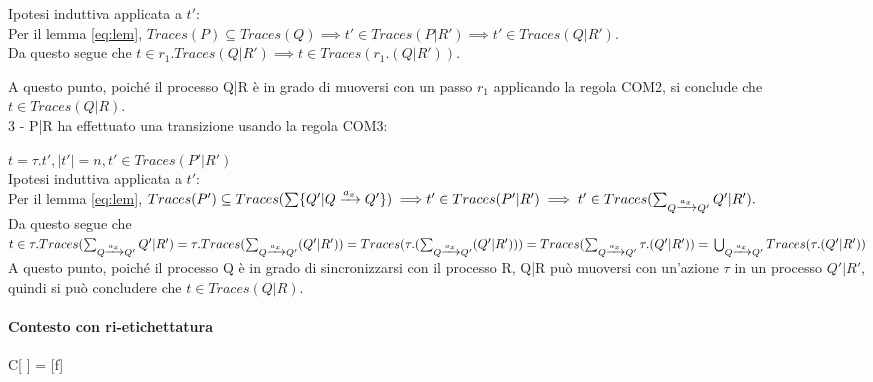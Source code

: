 Ipotesi induttiva applicata a $t'$: \\

Per il lemma \ref{eq:lem}, $Traces(P) \subseteq  Traces(Q) \implies t' \in Traces(P|R') \implies t' \in Traces(Q|R').$ \\

Da questo segue che $t \in r_1.Traces(Q|R') \implies t \in Traces(r_1.(Q|R')).$

A questo punto, poiché il processo Q|R è in grado di muoversi con un passo $r_1$ applicando la regola COM2,
si conclude che $t \in Traces(Q|R).$ \\

3 - P|R ha effettuato una transizione usando la regola COM3:

\begin{prooftree}
\end{prooftree}

$t = \tau.t', |t'| = n, t' \in Traces(P'|R')$ \\

Ipotesi induttiva applicata a $t'$: \\

Per il lemma \ref{eq:lem}, $Traces(P') \subseteq  Traces(\sum \{ Q' | Q \xrightarrow[]{a_x} Q' \}) \implies \\
t' \in Traces(P'|R') \implies t' \in Traces(\sum_{Q \xrightarrow[]{a_x} Q'} Q'|R').$ \\

Da questo segue che $t \in \tau.Traces(\sum_{Q \xrightarrow[]{a_x} Q'} Q'|R') = \tau.Traces(\sum_{Q \xrightarrow[]{a_x} Q'} (Q'|R')) \\
= Traces(\tau.(\sum_{Q \xrightarrow[]{a_x} Q'} (Q'|R'))) = Traces(\sum_{Q \xrightarrow[]{a_x} Q'} \tau.(Q'|R')) = \\
\bigcup_{Q \xrightarrow[]{a_x} Q'} Traces(\tau.(Q'|R'))$ \\

A questo punto, poiché il processo Q è in grado di sincronizzarsi con il processo R,
Q|R può muoversi con un'azione $\tau$ in un processo $Q'|R'$, quindi si può concludere che $t \in Traces(Q|R).$

\paragraph{Contesto con ri-etichettatura}

C[ ] =  [f]

